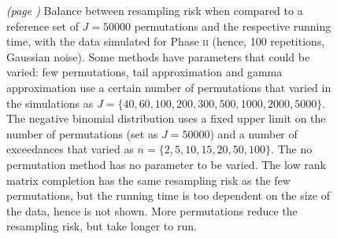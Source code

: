 \begin{figure}[!b]
\caption[Balance between resampling risk and the running time.]{\emph{(page \pageref{fig:risk+timing_noref})} Balance between resampling risk when compared to a reference set of $J=50000$ permutations and the respective running time, with the data simulated for Phase \textsc{ii} (hence, 100 repetitions, Gaussian noise). Some methods have parameters that could be varied: few permutations, tail approximation and gamma approximation use a certain number of permutations that varied in the simulations as $J = \{40, 60, 100, 200, 300, 500, 1000, 2000, 5000\}$. The negative binomial distribution uses a fixed upper limit on the number of permutations (set as $J=50000$) and a number of exceedances that varied as $n=\{2, 5, 10, 15, 20, 50, 100\}$. The no permutation method has no parameter to be varied. The low rank matrix completion has the same resampling risk as the few permutations, but the running time is too dependent on the size of the data, hence is not shown. More permutations reduce the resampling risk, but take longer to run.}
\label{fig:risk+timing}
\end{figure}

